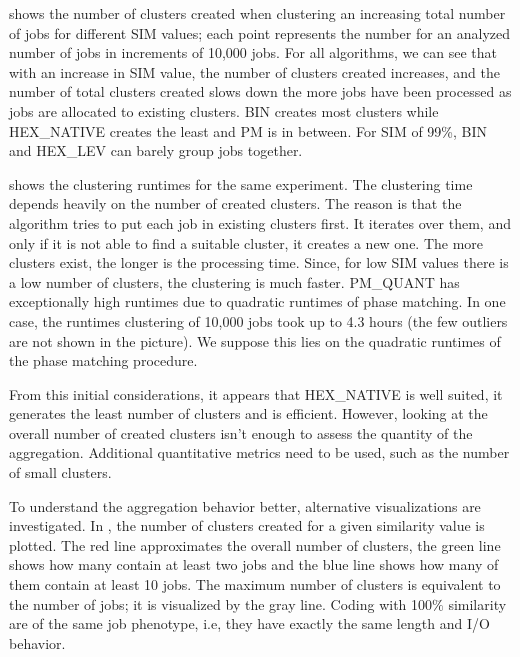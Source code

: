 \documentclass{jhps}
\begin{document}
 shows the number of clusters created when clustering an increasing total number of jobs for different SIM values; each point represents the number for an analyzed number of jobs in increments of 10,000 jobs.
For all algorithms, we can see that with an increase in SIM value, the number of clusters created increases, and the number of total clusters created slows down the more jobs have been processed as jobs are allocated to existing clusters.
BIN creates most clusters while HEX\_NATIVE creates the least and PM is in between.
For SIM of 99\%, BIN and HEX\_LEV can barely group jobs together.


 shows the clustering runtimes for the same experiment.
The clustering time depends heavily on the number of created clusters.
The reason is that the algorithm tries to put each job in existing clusters first.
It iterates over them, and only if it is not able to find a suitable cluster, it creates a new one.
The more clusters exist, the longer is the processing time.
Since, for low SIM values there is a low number of clusters, the clustering is much faster.
PM\_QUANT has exceptionally high runtimes due to quadratic runtimes of phase matching.
In one case, the runtimes clustering of 10,000 jobs took up to 4.3 hours (the few outliers are not shown in the picture).
We suppose this lies on the quadratic runtimes of the phase matching procedure.

From this initial considerations, it appears that HEX\_NATIVE is well suited, it generates the least number of clusters and is efficient.
However, looking at the overall number of created clusters isn't enough to assess the quantity of the aggregation.
Additional quantitative metrics need to be used, such as the number of small clusters.

\medskip

To understand the aggregation behavior better, alternative visualizations are investigated.
In , the number of clusters created for a given similarity value is plotted.
The red line approximates the overall number of clusters, the green line shows how many contain at least two jobs and the blue line shows how many of them contain at least 10 jobs.
The maximum number of clusters is equivalent to the number of jobs; it is visualized by the gray line.
Coding with 100$\%$  similarity are of the same job phenotype, i.e, they have exactly the same length and I/O behavior.
\end{document}
